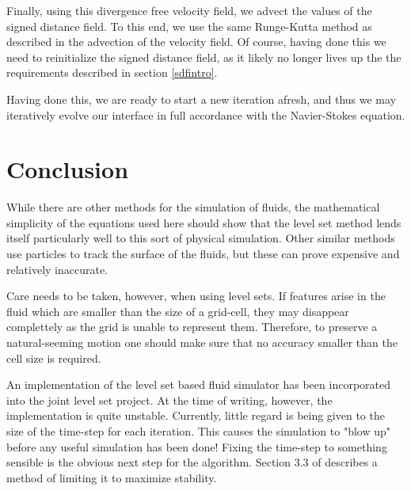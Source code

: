 Finally, using this divergence free velocity field, we advect the values of the signed distance field. To this end, we use the same Runge-Kutta method as described in the advection of the velocity field. Of course, having done this we need to reinitialize the signed distance field, as it likely no longer lives up the the requirements described in section \vref{sdfintro}.

Having done this, we are ready to start a new iteration afresh, and thus we may iteratively evolve our interface in full accordance with the Navier-Stokes equation.

\section{Conclusion}
While there are other methods for the simulation of fluids, the mathematical simplicity of the equations used here should show that the level set method lends itself particularly well to this sort of physical simulation. Other similar methods use particles to track the surface of the fluids, but these can prove expensive and relatively inaccurate.

Care needs to be taken, however, when using level sets. If features arise in the fluid which are smaller than the size of a grid-cell, they may disappear complettely as the grid is unable to represent them. Therefore, to preserve a natural-seeming motion one should make sure that no accuracy smaller than the cell size is required.

An implementation of the level set based fluid simulator has been incorporated into the joint level set project. At the time of writing, however, the implementation is quite unstable. Currently, little regard is being given to the size of the time-step for each iteration. This causes the simulation to "blow up" before any useful simulation has been done! Fixing the time-step to something sensible is the obvious next step for the algorithm. Section 3.3 of  describes a method of limiting it to maximize stability.
